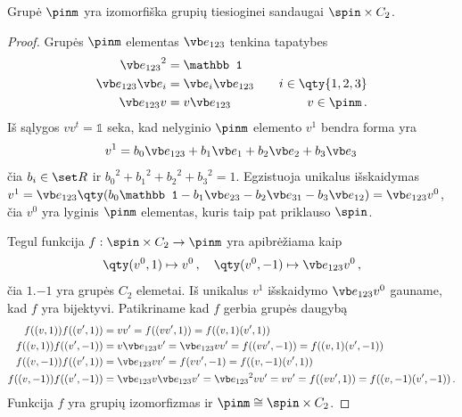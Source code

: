 \begin{proposition}
	Grupė $\pinm$ yra izomorfiška grupių tiesioginei sandaugai $\spin \times C_2$.
\end{proposition}
\begin{proof}
	Grupės $\pinm$ elementas $\vb e_{123}$ tenkina tapatybes
	\begin{align}
		{\vb e_{123}}^2 &= \mathbb1
		\\
		\vb e_{123} \vb e_i &= \vb e_i  \vb e_{123} \quad &i \in \qty{1,2,3}
		\\
		\vb e_{123} v &= v  \vb e_{123} \quad &v \in \pinm
		\,.
	\end{align}
	Iš sąlygos $vv^t = \mathbb1$ seka, kad nelyginio $\pinm$ elemento $v^1$ bendra forma yra
	\begin{equation}
		v^1 = 
		b_0 \vb e_{123}
		+ b_1 \vb e_1
		+ b_2 \vb e_2
		+ b_3 \vb e_3
		\,
	\end{equation}
	čia $b_i \in \set R$ ir
	${b_0}^2 + {b_1}^2 + {b_2}^2 + {b_3}^2 = 1$.
	Egzistuoja unikalus išskaidymas
	$
	v^1 = \vb e_{123}
	\qty({
		b_0 \mathbb1
		- b_1 \vb e_{23}
		- b_2 \vb e_{31}
		- b_3 \vb e_{12}
	})
	= \vb e_{123} v^0
	$, čia $v^0$ yra lyginis $\pinm$ elementas,
	kuris taip pat priklauso $\spin$.

	Tegul funkcija $f: \spin \times C_2 \to \pinm$ yra apibrėžiama kaip
	\begin{equation}
		\qty(v^0,1) \mapsto v^0
		\,,\quad
		\qty(v^0, -1) \mapsto \vb e_{123} v^0
		\,,
	\end{equation}
	čia $\qty{1,-1}$ yra grupės $C_2$ elemetai.
	Iš unikalus $v^1$ išskaidymo $\vb e_{123} v^0$ gauname,
	kad $f$ yra bijektyvi.
	Patikriname kad $f$ gerbia grupės daugybą
	\begin{equation}
		\begin{aligned}
			f((v,1))f((v',1)) &= vv' = f((vv',1)) = f((v,1)(v',1))
			\\
			f((v,1))f((v',-1)) &= v\vb e_{123}v' = \vb e_{123}vv' = f((vv', -1)) = f((v,1)(v',-1))
			\\
			f((v,-1))f((v',1)) &= \vb e_{123}vv' = f(vv', -1) = f((v,-1)(v',1))
			\\
			f((v,-1))f((v',-1)) &= \vb e_{123}v\vb e_{123}v' = {\vb e_{123}}^2 vv' = vv'= f((vv', 1)) = f((v,-1)(v',-1))
			\,.
		\end{aligned}
	\end{equation}
	Funkcija $f$ yra grupių izomorfizmas ir $\pinm \cong \spin \times C_2$.
\end{proof}

